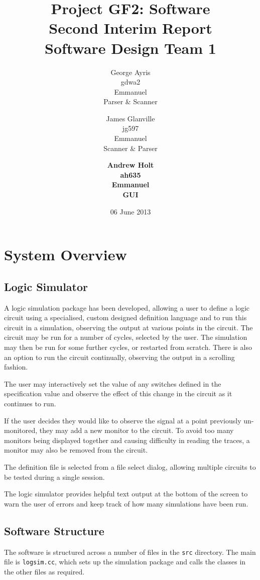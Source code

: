 \documentclass[a4paper,10pt]{article}  %
\title{Project GF2: Software\\ Second Interim Report\\ Software Design
  Team 1}
\author{George Ayris\\ gdwa2\\ Emmanuel \\ Parser \& Scanner
  \and James Glanville\\ jg597\\ Emmanuel \\ Scanner \& Parser
  \and \textbf{Andrew Holt}\\ \textbf{ah635}\\ \textbf{Emmanuel}\\ \textbf{GUI}}
\date{06 June 2013}
\begin{document}
\maketitle
{}
\tableofcontents
\newpage

\section{System Overview}
\label{sec:system-overview}

\subsection{Logic Simulator}
\label{sec:logic-simulator}

A logic simulation package has been developed, allowing a user to
define a logic circuit using a specialised, custom designed definition
language and to run this circuit in a simulation, observing the output
at various points in the circuit. The circuit may be run for a number
of cycles, selected by the user. The simulation may then be run for
some further cycles, or restarted from scratch. There is also an
option to run the circuit continually, observing the output in a
scrolling fashion.

The user may interactively set the value of any switches defined in
the specification value and observe the effect of this change in the
circuit as it continues to run.

If the user decides they would like to observe the signal at a point
previously un-monitored, they may add a new monitor to the circuit. To
avoid too many monitors being displayed together and causing
difficulty in reading the traces, a monitor may also be removed from
the circuit.

The definition file is selected from a file select dialog, allowing
multiple circuits to be tested during a single session.

The logic simulator provides helpful text output at the bottom of the
screen to warn the user of errors and keep track of how many simulations
have been run.

\subsection{Software Structure}
\label{sec:software-structure}

The software is structured across a number of files in the
\texttt{src} directory. The main file is \texttt{logsim.cc}, which sets
up the simulation package and calls the classes in the other files as
required.
\end{document}
